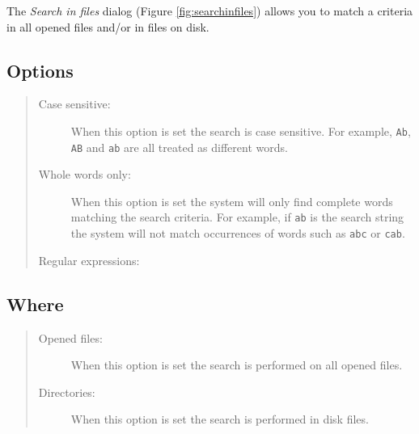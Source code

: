 The \textit{Search in files} dialog
(Figure \ref{fig:searchinfiles})
allows you to match a criteria in all opened files and/or in files on disk.


\subsection{Options}

\begin{quote}
  \begin{footnotesize}
    \begin{description}
      \item[Case sensitive:]
        When this option is set the search is case sensitive.
        For example, \texttt{Ab}, \texttt{AB} and \texttt{ab}
        are all treated as different words.
      \item[Whole words only:]
        When this option is set the system will only find complete
        words matching the search criteria. For example, if
        \texttt{ab} is the search string the system will not match
        occurrences of words such as \texttt{abc} or \texttt{cab}.
      \item[Regular expressions:]
    \end{description}
  \end{footnotesize}
\end{quote}


\subsection{Where}
\begin{quote}
  \begin{footnotesize}
    \begin{description}
      \item[Opened files:]
        When this option is set the search is performed on all opened files.
      \item[Directories:]
        When this option is set the search is performed in disk files.
    \end{description}
  \end{footnotesize}
\end{quote}


